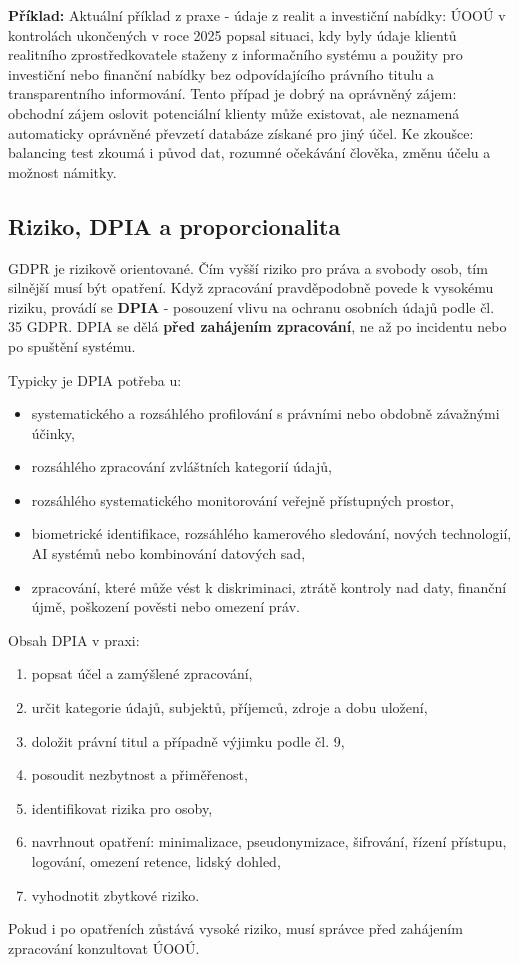 \documentclass[11pt,a4paper]{article}
\newcommand{\priklad}[1]{\begin{tcolorbox}[breakable,enhanced,colback=green!7,colframe=green!30!black,boxrule=0pt,arc=1mm,left=5pt,right=5pt,top=5pt,bottom=5pt,before skip=6pt,after skip=6pt]\textbf{Příklad:} #1\end{tcolorbox}}
\begin{document}
\priklad{Aktuální příklad z praxe - údaje z realit a investiční nabídky: ÚOOÚ v kontrolách ukončených v roce 2025 popsal situaci, kdy byly údaje klientů realitního zprostředkovatele staženy z informačního systému a použity pro investiční nebo finanční nabídky bez odpovídajícího právního titulu a transparentního informování. Tento případ je dobrý na oprávněný zájem: obchodní zájem oslovit potenciální klienty může existovat, ale neznamená automaticky oprávněné převzetí databáze získané pro jiný účel. Ke zkoušce: balancing test zkoumá i původ dat, rozumné očekávání člověka, změnu účelu a možnost námitky.}

\subsection*{Riziko, DPIA a proporcionalita}
GDPR je rizikově orientované. Čím vyšší riziko pro práva a svobody osob, tím silnější musí být opatření. Když zpracování pravděpodobně povede k vysokému riziku, provádí se \textbf{DPIA} - posouzení vlivu na ochranu osobních údajů podle čl. 35 GDPR. DPIA se dělá \textbf{před zahájením zpracování}, ne až po incidentu nebo po spuštění systému.

Typicky je DPIA potřeba u:
\begin{itemize}
  \item systematického a rozsáhlého profilování s právními nebo obdobně závažnými účinky,
  \item rozsáhlého zpracování zvláštních kategorií údajů,
  \item rozsáhlého systematického monitorování veřejně přístupných prostor,
  \item biometrické identifikace, rozsáhlého kamerového sledování, nových technologií, AI systémů nebo kombinování datových sad,
  \item zpracování, které může vést k diskriminaci, ztrátě kontroly nad daty, finanční újmě, poškození pověsti nebo omezení práv.
\end{itemize}

Obsah DPIA v praxi:
\begin{enumerate}
  \item popsat účel a zamýšlené zpracování,
  \item určit kategorie údajů, subjektů, příjemců, zdroje a dobu uložení,
  \item doložit právní titul a případně výjimku podle čl. 9,
  \item posoudit nezbytnost a přiměřenost,
  \item identifikovat rizika pro osoby,
  \item navrhnout opatření: minimalizace, pseudonymizace, šifrování, řízení přístupu, logování, omezení retence, lidský dohled,
  \item vyhodnotit zbytkové riziko.
\end{enumerate}
Pokud i po opatřeních zůstává vysoké riziko, musí správce před zahájením zpracování konzultovat ÚOOÚ.
\end{document}
